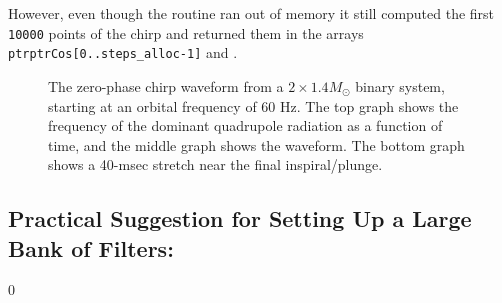 However, even though the routine ran out of memory it still computed
the first {\tt 10000} points of the chirp and returned them in the
arrays {\tt *ptrptrCos[0..steps\_alloc-1]}  and .


\begin{figure}
\begin{center}
\caption{ \label{f:chirp}
The zero-phase chirp waveform from a $2 \times 1.4 M_\odot$ binary system,
starting at an orbital frequency of 60 Hz.  The top graph shows the frequency
of the dominant quadrupole radiation as a function of time, and the middle graph
shows the waveform.  The bottom graph shows a 40-msec stretch near the final
inspiral/plunge.}
\end{center}
\end{figure}

\clearpage

\subsection{Practical Suggestion for Setting Up a Large Bank of Filters:}
\label{ss:practical}
\setcounter{equation}0


